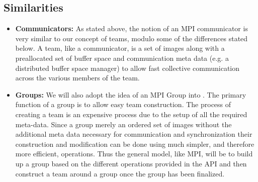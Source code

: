 \documentclass[times,10pt]{article}
\begin{document}
\subsection{Similarities}
\begin{itemize}
\item \textbf{Communicators:} As stated above, the notion of an MPI
communicator is very similar to our concept of teams, modulo some of the
differences stated below. A team, like a communicator, is a set of \gasnet
images along with a preallocated set of buffer space and communication meta
data (e.g. a distributed buffer space manager) to allow fast collective
communication across the various members of the team. 

\item \textbf{Groups:} We will also adopt the idea of an MPI Group into
\gasnet. The primary function of a \gasnet group is to allow easy team
construction. The process of creating a team is an expensive process due to the
setup of all the required meta-data. Since a group merely an ordered set of
images without the additional meta data necessary for communication and
synchronization their construction and modification can be done using much
simpler, and therefore more efficient, operations. Thus the general model, like
MPI, will be to build up a group based on the different operations provided in
the API and then construct a team around a group once the group has been
finalized. 
  

\end{itemize}
\end{document}

